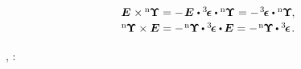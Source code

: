 \nopagebreak\vspace{-0.2em}
\begin{equation}\label{crossproductfortheunitdyadandsometensor}
\begin{array}{c}
\UnitDyad \hspace{.1ex} \times \hspace{-0.1ex} {^\mathrm{n}\hspace{-0.12ex}\bm{\Upsilon}}
= - \hspace{.2ex} \UnitDyad \hspace{.1ex} \dotp \permutationsparitytensor \dotp {^\mathrm{n}\hspace{-0.12ex}\bm{\Upsilon}}
= - \hspace{.2ex} \permutationsparitytensor \dotp {^\mathrm{n}\hspace{-0.12ex}\bm{\Upsilon}} \hspace{-0.15ex},
\\[.2em]
%
{^\mathrm{n}\hspace{-0.12ex}\bm{\Upsilon}} \times \UnitDyad
= - \hspace{.2ex} {^\mathrm{n}\hspace{-0.12ex}\bm{\Upsilon}} \hspace{-0.1ex} \dotp \permutationsparitytensor \dotp \hspace{-0.1ex} \UnitDyad
= - \hspace{.2ex} {^\mathrm{n}\hspace{-0.12ex}\bm{\Upsilon}} \hspace{-0.1ex} \dotp \permutationsparitytensor
\hspace{.2ex} .
\end{array}
\end{equation}

\vspace{-0.1em}
,
\::

